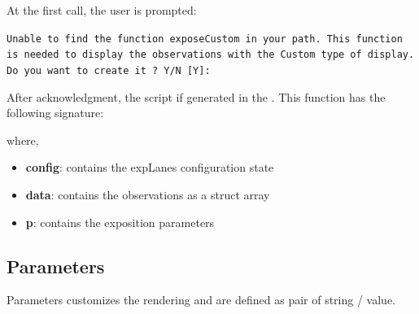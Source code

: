 \documentclass[a4paper,fleqn]{tufte-handout}
\newcommand{\explanes}{\textsf{expLanes} }
\begin{document}
At the first call, the user is prompted:

\texttt{Unable to find the function exposeCustom in your path. This function is needed to display the observations with the Custom type of display. \\
Do you want to create it ? Y/N [Y]:}

After acknowledgment, the script if generated in the . This function has the following signature:


where,
\begin{itemize}
\item \textbf{config}: contains the \explanes configuration state                  
\item \textbf{data}: contains the observations as a struct array                  
\item \textbf{p}: contains the exposition parameters   
\end{itemize}

\subsection{Parameters}

Parameters customizes the rendering and are defined as pair of string / value.
\end{document}
